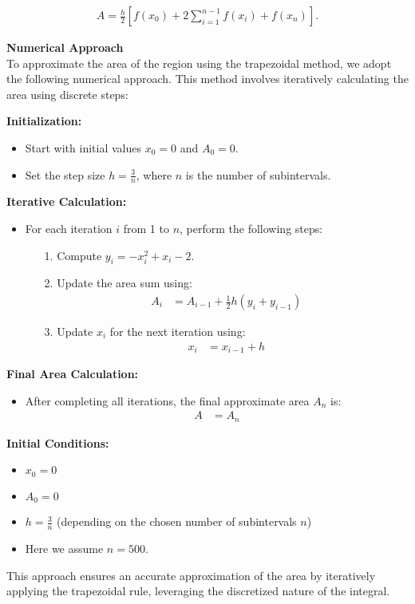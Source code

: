 \documentclass[article]{IEEEtran}
\numberwithin{figure}{enumi}
\begin{document}
\begin{align}
  A = \frac{h}{2} \left[ f(x_0) + 2\sum_{i=1}^{n-1} f(x_i) + f(x_n) \right].  
\end{align}


\textbf{Numerical Approach}\\

To approximate the area of the region using the trapezoidal method, we adopt the following numerical approach. This method involves iteratively calculating the area using discrete steps:

\textbf{Initialization:}
\begin{itemize}
    \item Start with initial values $x_0 = 0$ and $A_0 = 0$.
    \item Set the step size $h = \frac{3}{n}$, where $n$ is the number of subintervals.
\end{itemize}

\textbf{Iterative Calculation:}\\
\begin{itemize}
    \item For each iteration $i$ from 1 to $n$, perform the following steps:
    \begin{itemize}
        \item[1.] Compute $y_i = -x_i^2 + x_i - 2$.
        \item[2.] Update the area sum using:
        \begin{align}
        A_{i} &= A_{i-1} + \frac{1}{2} h (y_{i} + y_{i-1})
        \end{align}
        \item[3.] Update $x_i$ for the next iteration using:
        \begin{align}
        x_{i} &= x_{i-1} + h
        \end{align}
    \end{itemize}
\end{itemize}

\textbf{Final Area Calculation:}\\
\begin{itemize}
    \item After completing all iterations, the final approximate area $A_n$ is:
    \begin{align}
    A &= A_n
    \end{align}
\end{itemize}

\textbf{Initial Conditions:}
\begin{itemize}
    \item $x_0 = 0$
    \item $A_0 = 0$
    \item $h = \frac{3}{n}$ (depending on the chosen number of subintervals $n$)
    \item Here we assume $n = 500$.
\end{itemize}

This approach ensures an accurate approximation of the area by iteratively applying the trapezoidal rule, leveraging the discretized nature of the integral.
\end{document}
